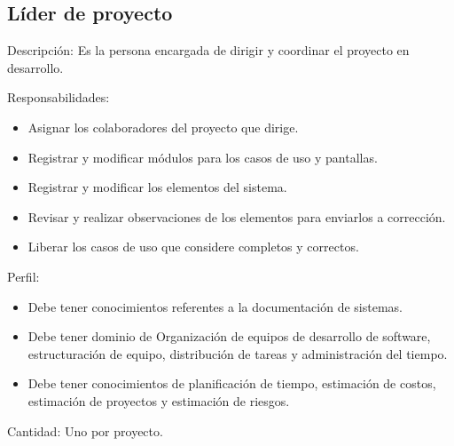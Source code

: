 \begin{Usuario}{\hypertarget{jefe}{\subsection{Líder de proyecto}}}{
}
	\item[Descripción:]
	Es la persona encargada de dirigir y coordinar el proyecto en desarrollo.
    \item[Responsabilidades:] \cdtEmpty
    \begin{itemize}
		\item Asignar los colaboradores del proyecto que dirige.
		\item Registrar y modificar módulos para los casos de uso y pantallas.
		\item Registrar y modificar los elementos del sistema.
		\item Revisar y realizar observaciones de los elementos para enviarlos a corrección.
		\item Liberar los casos de uso que considere completos y correctos.
    \end{itemize}

	\item[Perfil:] \cdtEmpty
    \begin{itemize}
		\item Debe tener conocimientos referentes a la documentación de sistemas.
		\item Debe tener dominio de Organización de equipos de desarrollo de software, estructuración de equipo, distribución de tareas y administración del tiempo.
		\item Debe tener conocimientos de planificación de tiempo, estimación de costos, estimación de proyectos y estimación de riesgos.
    \end{itemize}
    \item[Cantidad: ]
    Uno por proyecto.
\end{Usuario}


